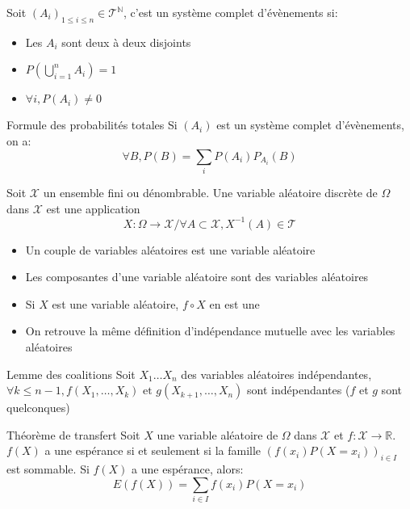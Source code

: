\documentclass[french, a4paper, 10pt, twocolumn]{article}
\newcommand{\N}{\mathbb{N}}   %
\newcommand{\R}{\mathbb{R}}   %
\begin{document}
\begin{definition}
  Soit \((A_i)_{1 \leqslant i \leqslant n} \in \mathcal{T}^{\N}\), c'est un système complet d'évènements si:
  \begin{itemize}[label=\(\bullet\)]
    \item Les \(A_i\) sont deux à deux disjoints
    \item \(P\left(\bigcup_{i=1}^{n}A_i\right)=1\)
    \item \(\forall i, P(A_i)\neq 0\)
  \end{itemize}
\end{definition}

\begin{theoreme}{Formule des probabilités totales}
  Si $(A_i)$ est un système complet d'évènements, on a:
    \[\forall B, P(B)=\sum_{i}P(A_i)P_{A_i}(B)\]
\end{theoreme}

\begin{definition}
  Soit \(\mathcal{X}\) un ensemble fini ou dénombrable.
  Une variable aléatoire discrète de \(\Omega\) dans \(\mathcal{X}\) est une application
  \[X: \Omega \rightarrow \mathcal{X} / \forall A \subset \mathcal{X}, X^{-1}(A) \in \mathcal{T}\]

  \tcblower
  \begin{itemize}
    \item Un couple de variables aléatoires est une variable aléatoire
    \item Les composantes d'une variable aléatoire sont des variables aléatoires
    \item Si \(X\) est une variable aléatoire, \(f\circ X\) en est une
    \item On retrouve la même définition d'indépendance mutuelle avec les variables aléatoires
  \end{itemize}
\end{definition}

\begin{theoreme}{Lemme des coalitions}
  Soit \(X_1\dots X_n\) des variables aléatoires indépendantes,
  \(\forall k \leqslant n-1, f(X_1,\dots,X_k) \text{ et } g(X_{k+1},\dots,X_n)\) sont indépendantes (\(f\) et \(g\) sont quelconques)
\end{theoreme}

\begin{theoreme}{Théorème de transfert}
  Soit \(X\) une variable aléatoire de \(\Omega\) dans \(\mathcal{X}\) et \(f: \mathcal{X} \rightarrow \R\).
  \(f(X)\) a une espérance si et seulement si la famille \((f(x_i)P(X=x_i))_{i\in I}\) est sommable.
  Si \(f(X)\) a une espérance, alors:
  \[E(f(X))=\sum_{i\in I}f(x_i)P(X=x_i)\]
\end{theoreme}
\end{document}
